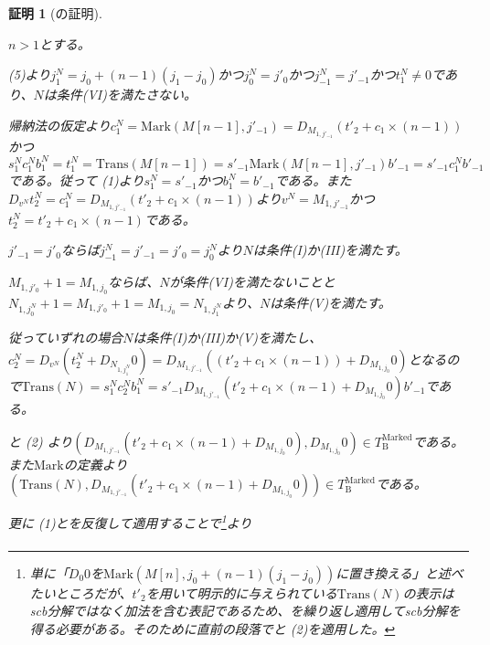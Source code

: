 \documentclass[dvipdfmx,uplatex]{jsarticle}
\theoremstyle{customnonumberbreakfortheorem}
\theoremstyle{customnonumberbreakforproof}
\newtheorem{hideableproof}{証明}
\begin{document}
\begin{hideableproof}[の証明]
\begin{indented}
\begin{indented}
\begin{indented}
				\item \(n > 1\)とする。
				\begin{indented}
					\item {} (5)より\(j_1^N = j_0+(n-1)(j_1-j_0)\)かつ\(j_0^N = j'_0\)かつ\(j_{-1}^N = j'_{-1}\)かつ\(t_1^N \neq 0\)であり、\(N\)は条件(VI)を満たさない。
					\item 帰納法の仮定より\(c_1^N = \textrm{Mark}(M[n-1],j'_{-1}) = D_{M_{1,j'_{-1}}}(t'_2 + c_1 \times (n-1))\)かつ\(s_1^N c_1^N b_1^N = t_1^N = \textrm{Trans}(M[n-1]) = s'_{-1} \textrm{Mark}(M[n-1],j'_{-1}) b'_{-1} = s'_{-1} c_1^N b'_{-1}\)である。従って (1)より\(s_1^N = s'_{-1}\)かつ\(b_1^N = b'_{-1}\)である。また\(D_{v^N} t_2^N = c_1^N = D_{M_{1,j'_{-1}}}(t'_2 + c_1 \times (n-1))\)より\(v^N = M_{1,j'_{-1}}\)かつ\(t_2^N = t'_2 + c_1 \times (n-1)\)である。
					\item \(j'_{-1} = j'_0\)ならば\(j_{-1}^N = j'_{-1} = j'_0 = j_0^N\)より\(N\)は条件(I)か(III)を満たす。
					\item \(M_{1,j'_0}+1 = M_{1,j_0}\)ならば、\(N\)が条件(VI)を満たないことと\(N_{1,j_0^N}+1 = M_{1,j'_0}+1 = M_{1,j_0} = N_{1,j_1^N}\)より、\(N\)は条件(V)を満たす。
					\item 従っていずれの場合\(N\)は条件(I)か(III)か(V)を満たし、\(c_2^N = D_{v^N}(t_2^N + D_{N_{1,j_1^N}} 0) = D_{M_{1,j'_{-1}}}((t'_2 + c_1 \times (n-1)) + D_{M_{1,j_0}} 0)\)となるので\(\textrm{Trans}(N) = s_1^N c_2^N b_1^N = s'_{-1} D_{M_{1,j'_{-1}}}(t'_2 + c_1 \times (n-1) + D_{M_{1,j_0}} 0) b'_{-1}\)である。
					\item {}と (2) より\((D_{M_{1,j'_{-1}}}(t'_2 + c_1 \times (n-1) + D_{M_{1,j_0}} 0),D_{M_{1,j_0}} 0) \in T_{\textrm{B}}^{\textrm{Marked}}\)である。また\(\textrm{Mark}\)の定義より\((\textrm{Trans}(N),D_{M_{1,j'_{-1}}}(t'_2 + c_1 \times (n-1) + D_{M_{1,j_0}} 0)) \in T_{\textrm{B}}^{\textrm{Marked}}\)である。
					\item 更に (1)とを反復して適用することで\footnote{単に「\(D_0 0\)を\(\textrm{Mark}(M[n],j_0+(n-1)(j_1-j_0))\)に置き換える」と述べたいところだが、\(t'_2\)を用いて明示的に与えられている\(\textrm{Trans}(N)\)の表示はscb分解ではなく加法を含む表記であるため、を繰り返し適用してscb分解を得る必要がある。そのために直前の段落でと (2)を適用した。}より
					\begin{eqnarray*}

\end{eqnarray*}
\end{indented}
\end{indented}
\end{indented}
\end{indented}
\end{hideableproof}
\end{document}
